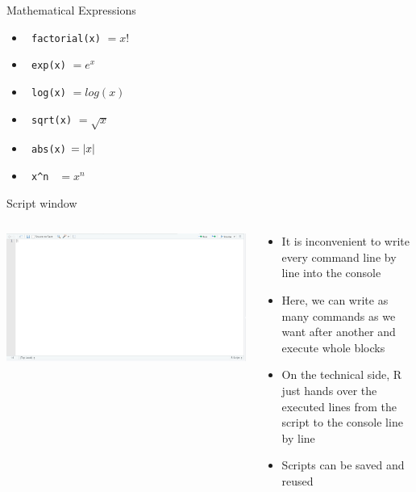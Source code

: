 \documentclass[aspectratio = 169]{chariteBeamer}
\begin{document}
\begin{frame}[fragile]{Mathematical Expressions}
	\begin{itemize}
		\item \verb+ factorial(x)+ $= x!$
		\item \verb+ exp(x)+ $=e^x$
		\item \verb+ log(x)+ $=log(x)$
		\item \verb+ sqrt(x)+ $=\sqrt{x}$
		\item \verb+ abs(x)+ $=\left\lvert x \right\rvert$
		\item \verb+ x^n + $=x^n$
	\end{itemize}
\end{frame}

\begin{frame}{Script window}
	\begin{columns}[T]
	\begin{column}{0.6\textwidth}
	\includegraphics[width=\textwidth]{Rstudio_interface_i}
	\end{column}
	\begin{column}{0.4\textwidth}
	\begin{itemize}
		\item \small It is inconvenient to write every command line by line into the console
		\item \small Here, we can write as many commands as we want after another and execute whole blocks
		\item \small On the technical side, R just hands over the executed lines from the script to the console line by line
		\item \small Scripts can be saved and reused
	\end{itemize}
	\end{column}
\end{columns}
\end{frame}
\end{document}
